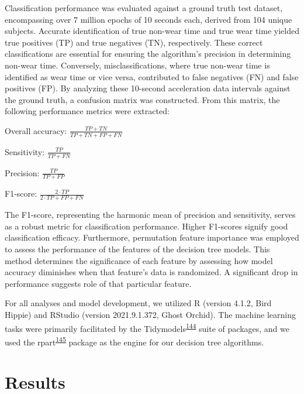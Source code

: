 \documentclass[
  10pt,
]{scrbook}
\begin{document}
Classification performance was evaluated against a ground truth test
dataset, encompassing over 7 million epochs of 10 seconds each, derived
from 104 unique subjects. Accurate identification of true non-wear time
and true wear time yielded true positives (TP) and true negatives (TN),
respectively. These correct classifications are essential for ensuring
the algorithm's precision in determining non-wear time. Conversely,
misclassifications, where true non-wear time is identified as wear time
or vice versa, contributed to false negatives (FN) and false positives
(FP). By analyzing these 10-second acceleration data intervals against
the ground truth, a confusion matrix was constructed. From this matrix,
the following performance metrics were extracted:

Overall accuracy: \(\frac{TP+TN}{TP+TN+FP+FN}\)

Sensitivity: \(\frac{TP}{TP+FN}​\)

Precision: \(\frac{TP}{TP+FP}\)

\hspace{0pt}F1-score: \(\frac{2 \cdot TP}{2 \cdot TP+FP+FN}​\)

The F1-score, representing the harmonic mean of precision and
sensitivity, serves as a robust metric for classification performance.
Higher F1-scores signify good classification efficacy. Furthermore,
permutation feature importance was employed to assess the performance of
the features of the decision tree models. This method determines the
significance of each feature by assessing how model accuracy diminishes
when that feature's data is randomized. A significant drop in
performance suggests role of that particular feature.

For all analyses and model development, we utilized R (version 4.1.2,
Bird Hippie) and RStudio (version 2021.9.1.372, Ghost Orchid). The
machine learning tasks were primarily facilitated by the
Tidymodels\textsuperscript{\protect\hyperlink{ref-kuhn_tidymodels_2020}{144}}
suite of packages, and we used the
rpart\textsuperscript{\protect\hyperlink{ref-rpart}{145}} package as the
engine for our decision tree algorithms.

\hypertarget{results-1}{%
\section{Results}\label{results-1}}
\end{document}
